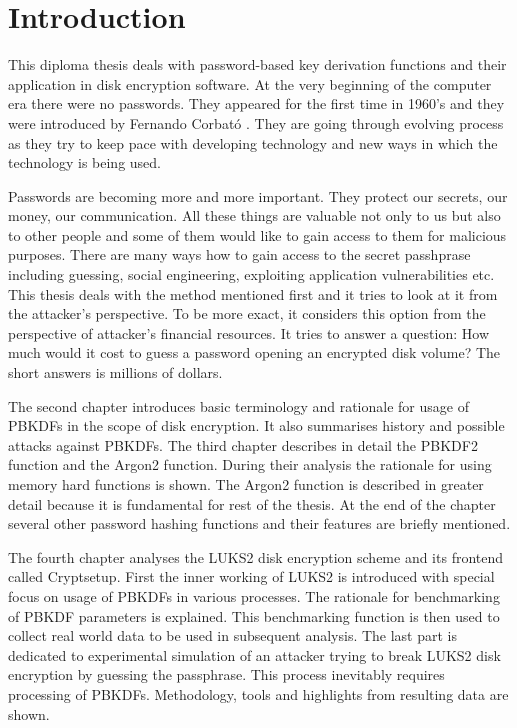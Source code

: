\documentclass[nolof]{fithesis3}
\begin{document}
\tableofcontents
\chapter{Introduction}
This diploma thesis deals with password-based key derivation functions and their application in disk encryption software. At the very beginning of the computer era there were no passwords. They appeared for the first time in 1960's and they were introduced by Fernando Corbató \parencite{ctss}. They are going through evolving process as they try to keep pace with developing technology and new ways in which the technology is being used.

Passwords are becoming more and more important. They protect our secrets, our money, our communication. All these things are valuable not only to us but also to other people and some of them would like to gain access to them for malicious purposes. There are many ways how to gain access to the secret passhprase including guessing, social engineering, exploiting application vulnerabilities etc. This thesis deals with the method mentioned first and it tries to look at it from the attacker's perspective. To be more exact, it considers this option from the perspective of attacker's financial resources. It tries to answer a question: How much would it cost to guess a password opening an encrypted disk volume? The short answers is millions of dollars.

The second chapter introduces basic terminology and rationale for usage of PBKDFs in the scope of disk encryption. It also summarises history and possible attacks against PBKDFs. The third chapter describes in detail the PBKDF2 function and the Argon2 function. During their analysis the rationale for using memory hard functions is shown. The Argon2 function is described in greater detail because it is fundamental for rest of the thesis. At the end of the chapter several other password hashing functions and their features are briefly mentioned.

The fourth chapter analyses the LUKS2 disk encryption scheme and its frontend called Cryptsetup. First the inner working of LUKS2 is introduced with special focus on usage of PBKDFs in various processes. The rationale for benchmarking of PBKDF parameters is explained. This benchmarking function is then used to collect real world data to be used in subsequent analysis. The last part is dedicated to experimental simulation of an attacker trying to break LUKS2 disk encryption by guessing the passphrase. This process inevitably requires processing of PBKDFs. Methodology, tools and highlights from resulting data are shown.
\end{document}
